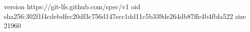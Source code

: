 version https://git-lfs.github.com/spec/v1
oid sha256:302f1f4cdebdfec20df3c756d147ecc1dd11c5b339de264db87ffe4b4fbfa522
size 21960
